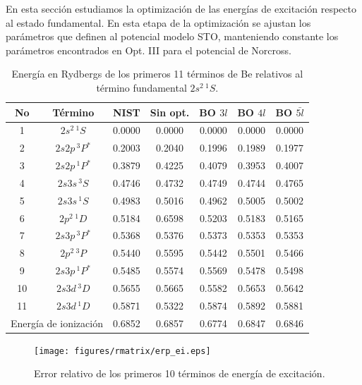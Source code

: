 En esta sección estudiamos la optimización de las energías de excitación 
respecto al estado fundamental. En esta etapa de la optimización se 
ajustan los parámetros que definen al potencial modelo STO, manteniendo
constante los parámetros encontrados en Opt. III para el potencial de 
Norcross. 

\begin{table}
\centering
\begin{tabular}{|cc|ccccc|}
\hline 
No & Término      & NIST & Sin opt. & BO $3l$ & BO $4l$ & BO $\bar{5l}$ \\
\hline 
\hline 
1 & $2s^2\,^1S$   & 0.0000 & 0.0000 & 0.0000 & 0.0000 & 0.0000 \\
2 & $2s2p\,^3P^*$ & 0.2003 & 0.2040 & 0.1996 & 0.1989 & 0.1977 \\
3 & $2s2p\,^1P^*$ & 0.3879 & 0.4225 & 0.4079 & 0.3953 & 0.4007 \\
4 & $2s3s\,^3S$   & 0.4746 & 0.4732 & 0.4749 & 0.4744 & 0.4765 \\
5 & $2s3s\,^1S$   & 0.4983 & 0.5016 & 0.4962 & 0.5005 & 0.5002 \\
6 & $2p^2\,^1D$   & 0.5184 & 0.6598 & 0.5203 & 0.5183 & 0.5165 \\
7 & $2s3p\,^3P^*$ & 0.5368 & 0.5376 & 0.5373 & 0.5353 & 0.5353 \\
8 & $2p^2\,^3P$   & 0.5440 & 0.5595 & 0.5442 & 0.5501 & 0.5466 \\
9 & $2s3p\,^1P^*$ & 0.5485 & 0.5574 & 0.5569 & 0.5478 & 0.5498 \\
10 & $2s3d\,^3D$  & 0.5655 & 0.5665 & 0.5582 & 0.5653 & 0.5642 \\
11 & $2s3d\,^1D$  & 0.5871 & 0.5322 & 0.5874 & 0.5892 & 0.5881 \\
\hline
\multicolumn{2}{l}{Energía de ionización} 
                  & 0.6852 & 0.6857 & 0.6774 & 0.6847 & 0.6846  \\ 
\hline
\end{tabular}
\caption[Energías de excitación de Be.]
{Energía en Rydbergs de los primeros 11 términos de Be relativos 
al término fundamental $2s^2\,^1S$.}
\label{tab:exener}
\end{table}

\begin{figure}
\centering
\texttt{[image: figures/rmatrix/erp\_ei.eps]} 
\caption[Error relativo de los primeros 10 términos de excitación.]
{Error relativo de los primeros 10 términos de energía de excitación.}
\label{fig:exener}
\end{figure}

